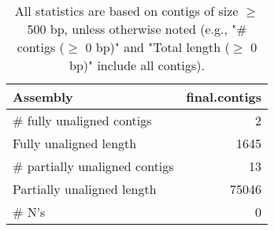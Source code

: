 \documentclass[12pt,a4paper]{article}
\begin{document}
\begin{table}[ht]
\begin{center}
\caption{All statistics are based on contigs of size $\geq$ 500 bp, unless otherwise noted (e.g., "\# contigs ($\geq$ 0 bp)" and "Total length ($\geq$ 0 bp)" include all contigs).}
\begin{tabular}{|l*{1}{|r}|}
\hline
Assembly & final.contigs \\ \hline
\# fully unaligned contigs & 2 \\ \hline
Fully unaligned length & 1645 \\ \hline
\# partially unaligned contigs & 13 \\ \hline
Partially unaligned length & 75046 \\ \hline
\# N's & 0 \\ \hline
\end{tabular}
\end{center}
\end{table}
\end{document}
